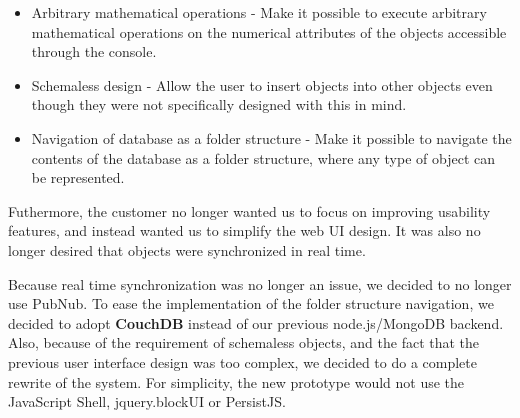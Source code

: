 \begin{itemize}
\item Arbitrary mathematical operations - Make it possible to execute arbitrary mathematical operations on the numerical attributes of the objects accessible through the console.
\item Schemaless design - Allow the user to insert objects into other objects even though they were not specifically designed with this in mind.
\item Navigation of database as a folder structure - Make it possible to navigate the contents of the database as a folder structure, where any type of object can be represented.
\end{itemize}
Futhermore, the customer no longer wanted us to focus on improving usability features, and instead wanted us to simplify the web UI design. It was also no longer desired that objects were synchronized in real time.

Because real time synchronization was no longer an issue, we decided to no longer use PubNub. To ease the implementation of the folder structure navigation, we decided to adopt \textbf{CouchDB} instead of our previous node.js/MongoDB backend. Also, because of the requirement of schemaless objects, and the fact that the previous user interface design was too complex, we decided to do a complete rewrite of the system. For simplicity, the new prototype would not use the JavaScript Shell, jquery.blockUI or PersistJS.

